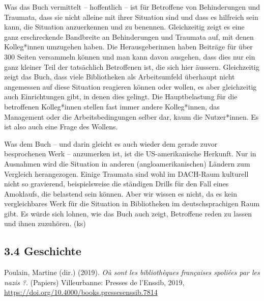 \documentclass[a4paper,
fontsize=11pt,
oneside,
numbers=noperiodatend,
parskip=half-,
bibliography=totoc,
final
]{scrartcl}
\begin{document}
Was das Buch vermittelt -- hoffentlich -- ist für Betroffene von
Behinderungen und Traumata, dass sie nicht alleine mit ihrer Situation
sind und dass es hilfreich sein kann, die Situation anzuerkennen und zu
benennen. Gleichzeitig zeigt es eine ganz erschreckende Bandbreite an
Behinderungen und Traumata auf, mit denen Kolleg*innen umzugehen haben.
Die Herausgeberinnen haben Beiträge für über 300 Seiten versammeln
können und man kann davon ausgehen, dass dies nur ein ganz kleiner Teil
der tatsächlich Betroffenen ist, die sich hier äussern. Gleichzeitig
zeigt das Buch, dass viele Bibliotheken als Arbeitsumfeld überhaupt
nicht angemessen auf diese Situation reagieren können oder wollen, es
aber gleichzeitig auch Einrichtungen gibt, in denen dies gelingt. Die
Hauptbelastung für die betroffenen Kolleg*innen stellen fast immer
andere Kolleg*innen, das Management oder die Arbeitsbedingungen selber
dar, kaum die Nutzer*innen. Es ist also auch eine Frage des Wollens.

Was dem Buch -- und darin gleicht es auch wieder dem gerade zuvor
besprochenen Werk -- anzumerken ist, ist die US-amerikanische Herkunft.
Nur in Ausnahmen wird die Situation in anderen (angloamerikanischen)
Ländern zum Vergleich herangezogen. Einige Traumata sind wohl im
DACH-Raum kulturell nicht so gravierend, beispielsweise die ständigen
Drills für den Fall eines Amoklaufs, die belastend sein können. Aber wir
wissen es nicht, da es kein vergleichbares Werk für die Situation in
Bibliotheken im deutschsprachigen Raum gibt. Es würde sich lohnen, wie
das Buch auch zeigt, Betroffene reden zu lassen und ihnen zuzuhören.
(ks)

\hypertarget{geschichte}{%
\subsection{3.4 Geschichte}\label{geschichte}}

Poulain, Martine (dir.) (2019). \emph{Où sont les bibliothèques
françaises spoliées par les nazis ?}. (Papiers) Villeurbanne: Presses de
l'Enssib, 2019, \url{https://doi.org/10.4000/books.pressesenssib.7814}
\end{document}
